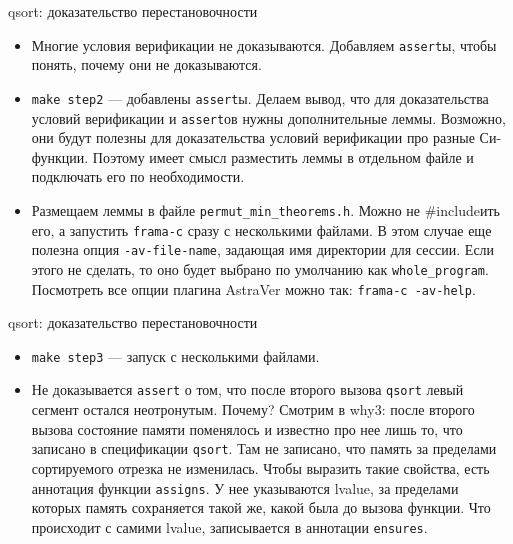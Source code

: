 \documentclass[hyperref={unicode=true}]{beamer}
\begin{document}
    \begin{frame}{qsort: доказательство перестановочности}
    \begin{itemize}
    \item Многие условия верификации не доказываются. Добавляем \texttt{assert}ы, чтобы понять, почему они не доказываются.
    \item \texttt{make step2} --- добавлены \texttt{assert}ы. Делаем вывод, что для доказательства условий верификации и
    \texttt{assert}ов нужны дополнительные леммы. Возможно, они будут полезны для доказательства условий верификации про
    разные Си-функции. Поэтому имеет смысл разместить леммы в отдельном файле и подключать его по необходимости.
    \item Размещаем леммы в файле \texttt{permut\_min\_theorems.h}. Можно не \#includeить его, а запустить \texttt{frama-c}
    сразу с несколькими файлами. В этом случае еще полезна опция \texttt{-av-file-name}, задающая имя директории для сессии.
    Если этого не сделать, то оно будет выбрано по умолчанию как \texttt{whole\_program}. Посмотреть все опции плагина AstraVer
    можно так: \texttt{frama-c -av-help}.
    \end{itemize}
    \end{frame}

    \begin{frame}{qsort: доказательство перестановочности}
    \begin{itemize}
    \item \texttt{make step3} --- запуск с несколькими файлами.
    \item Не доказывается \texttt{assert} о том, что после второго вызова \texttt{qsort} левый сегмент остался неотронутым. Почему?
    Смотрим в why3: после второго вызова состояние памяти поменялось и известно про нее лишь то, что записано
    в спецификации \texttt{qsort}. Там не записано, что память за пределами сортируемого отрезка не изменилась. Чтобы выразить
    такие свойства, есть аннотация функции \texttt{assigns}. У нее указываются lvalue, за пределами которых память сохраняется
    такой же, какой была до вызова функции. Что происходит с самими lvalue, записывается в аннотации \texttt{ensures}.
    \end{itemize}
    \end{frame}
\end{document}
